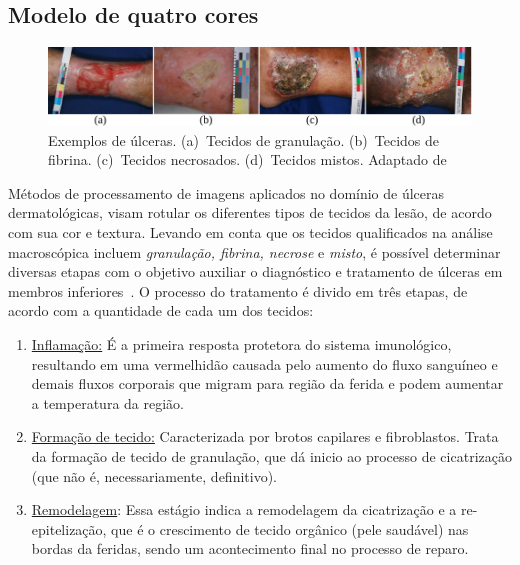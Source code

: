 \subsection{Modelo de quatro cores}

\begin{figure}[!t]
    \centering
    \includegraphics[scale=1]{_fig/tecidos.pdf}
    \caption[Exemplos de úlceras]{Exemplos de úlceras. 
    (a)~Tecidos de granulação. 
    (b)~Tecidos de fibrina. 
    (c)~Tecidos necrosados.
    (d)~Tecidos mistos. 
    Adaptado de  }
    \label{figTecidos}
\end{figure}

Métodos de processamento de imagens aplicados no domínio de úlceras dermatológicas, visam rotular os diferentes tipos de tecidos da lesão, de acordo com sua cor e  textura.
Levando em conta que os tecidos qualificados na análise macroscópica incluem \textit{granulação, fibrina, necrose} e \textit{misto}, é possível determinar diversas etapas com o objetivo auxiliar o diagnóstico e tratamento de úlceras em membros inferiores~\cite{Blanco2016}. 
O processo do tratamento é divido em três etapas, de acordo com a quantidade de cada um dos tecidos:

\begin{enumerate}

\item \underline{Inflamação:} É a primeira resposta protetora do sistema imunológico, resultando em uma vermelhidão causada pelo aumento do fluxo sanguíneo e demais fluxos corporais que migram para região da ferida e podem aumentar a temperatura da região. 

\item \underline{Formação de tecido:} Caracterizada por brotos capilares e fibroblastos. 
Trata da formação de tecido de granulação, que dá inicio ao processo de cicatrização (que não é, necessariamente, definitivo). 

\item \underline{Remodelagem}: Essa estágio indica a remodelagem da cicatrização e a re-e\-pi\-te\-li\-za\-ção, que é o crescimento de tecido orgânico (pele saudável) nas bordas da feridas, sendo um acontecimento final no processo de reparo.

\end{enumerate}

